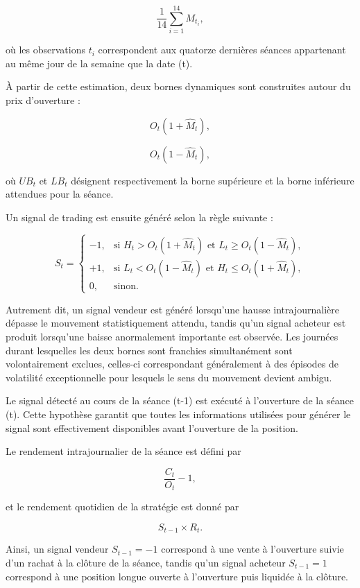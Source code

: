 \documentclass[11pt]{report}
\begin{document}
$$
\frac{1}{14}
\sum_{i=1}^{14}
M_{t_i},
$$

où les observations $t_i$ correspondent aux quatorze dernières séances appartenant au même jour de la semaine que la date (t).

À partir de cette estimation, deux bornes dynamiques sont construites autour du prix d'ouverture :

$$
O_t
\left(
1+\widehat{M}_t
\right),
$$

$$
O_t
\left(
1-\widehat{M}_t
\right),
$$

où $UB_t$ et $LB_t$ désignent respectivement la borne supérieure et la borne inférieure attendues pour la séance.

Un signal de trading est ensuite généré selon la règle suivante :

$$
S_t=
\begin{cases}
-1, & \text{si } H_t > O_t\left(1+\widehat{M}_t\right)
      \text{ et }
      L_t \geq O_t\left(1-\widehat{M}_t\right), \\[0.35cm]
+1, & \text{si } L_t < O_t\left(1-\widehat{M}_t\right)
      \text{ et }
      H_t \leq O_t\left(1+\widehat{M}_t\right), \\[0.35cm]
0, & \text{sinon.}
\end{cases}
$$

Autrement dit, un signal vendeur est généré lorsqu'une hausse intrajournalière dépasse le mouvement statistiquement attendu, tandis qu'un signal acheteur est produit lorsqu'une baisse anormalement importante est observée. Les journées durant lesquelles les deux bornes sont franchies simultanément sont volontairement exclues, celles-ci correspondant généralement à des épisodes de volatilité exceptionnelle pour lesquels le sens du mouvement devient ambigu.

Le signal détecté au cours de la séance (t-1) est exécuté à l'ouverture de la séance (t). Cette hypothèse garantit que toutes les informations utilisées pour générer le signal sont effectivement disponibles avant l'ouverture de la position.

Le rendement intrajournalier de la séance est défini par

$$
\frac{C_t}{O_t}-1,
$$

et le rendement quotidien de la stratégie est donné par


$$
S_{t-1}\times R_t.
$$

Ainsi, un signal vendeur $S_{t-1}=-1$ correspond à une vente à l'ouverture suivie d'un rachat à la clôture de la séance, tandis qu'un signal acheteur $S_{t-1}=1$ correspond à une position longue ouverte à l'ouverture puis liquidée à la clôture.
\end{document}
